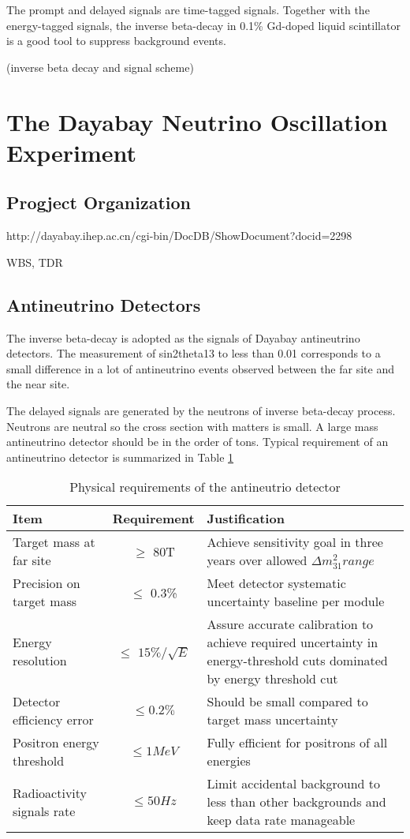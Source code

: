 The prompt and delayed signals are time-tagged signals.
Together with the energy-tagged signals, the inverse beta-decay
in 0.1\% Gd-doped liquid scintillator is a good tool to suppress
background events.


(inverse beta decay and signal scheme)


\section{The Dayabay Neutrino Oscillation Experiment}



\subsection{Progject Organization}

http://dayabay.ihep.ac.cn/cgi-bin/DocDB/ShowDocument?docid=2298

WBS, TDR


\subsection{Antineutrino Detectors}

The inverse beta-decay is adopted as the signals of Dayabay antineutrino detectors.
The measurement of sin2theta13 to less than 0.01 corresponds to a small
difference in a lot of antineutrino events observed between the far site and
the near site.

The delayed signals are generated by the neutrons of inverse beta-decay process.
Neutrons are neutral so the cross section with matters is small.
A large mass antineutrino detector should be in the order of tons.
Typical requirement of an antineutrino detector is summarized in Table \ref{tab:ADRequirement}


\begin{table}
\centering
\caption{Physical requirements of the antineutrio detector\cite{TDR}}
\label{tab:ADRequirement}
\begin{tabular}{lcp{5.0cm}}
\hline
Item & Requirement & Justification\\
\hline
\hline
Target mass at far site &
$\geq$ 80T &
Achieve sensitivity goal in three years over allowed ${\Delta}m^{2}_31 range$ \\
\hline
Precision on target mass &
$\leq$ 0.3\% &
Meet detector systematic uncertainty baseline per module \\
\hline
Energy resolution &
$\leq$ $15\%/\sqrt{E}$ &
Assure accurate calibration to achieve required uncertainty in energy-threshold cuts dominated by energy threshold cut \\
\hline
Detector efficiency error &
$\leq 0.2\%$ &
Should be small compared to target mass uncertainty \\
\hline
Positron energy threshold &
$\leq 1MeV$ &
Fully efficient for positrons of all energies \\
Radioactivity signals rate &
$\leq 50 Hz$ &
Limit accidental background to less than other backgrounds and keep data rate manageable \\
\hline
\end{tabular}
\end{table}


